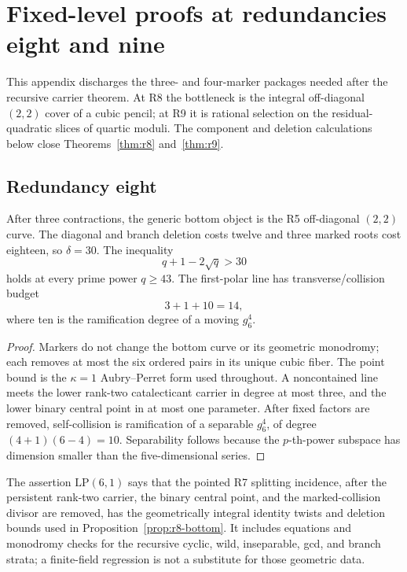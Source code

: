 \section{Fixed-level proofs at redundancies eight and nine}\label{sec:fixed}

This appendix discharges the three- and four-marker packages needed after the
recursive carrier theorem.  At R8 the bottleneck is the integral
off-diagonal \((2,2)\) cover of a cubic pencil; at R9 it is rational selection
on the residual-quadratic slices of quartic moduli.  The component and deletion
calculations below close Theorems~\ref{thm:r8} and~\ref{thm:r9}.

\subsection{Redundancy eight}

\begin{proposition}\label{prop:r8-bottom}%
%
After three contractions, the generic bottom object is the R5
off-diagonal $(2,2)$ curve.  The diagonal and branch deletion costs
twelve and three marked roots cost eighteen, so
$\delta=30$.  The inequality
\[
       q+1-2\sqrt q>30
\]
holds at every prime power $q\geq43$.  The first-polar line has
transverse/collision budget
\[
       3+1+10=14,
\]
where ten is the ramification degree of a moving $g^4_6$.
\end{proposition}

\begin{proof}
Markers do not change the bottom curve or its geometric monodromy;
each removes at most the six ordered pairs in its unique cubic fiber.
The point bound is the \(\kappa=1\) Aubry--Perret form used throughout.
A noncontained line meets the lower
rank-two catalecticant carrier in degree at most three, and the lower
binary central point in at most one parameter.  After fixed factors are
removed, self-collision is ramification of a separable $g^4_6$, of
degree $(4+1)(6-4)=10$.  Separability follows because the
$p$-th-power subspace has dimension smaller than the five-dimensional
series.
\end{proof}

\begin{definition}
\label{def:r8-lower-package}
The assertion $\mathrm{LP}(6,1)$ says that the pointed R7 splitting
incidence, after the persistent rank-two carrier, the binary central
point, and the marked-collision divisor are removed, has the
geometrically integral identity twists and deletion bounds used in
Proposition~\ref{prop:r8-bottom}.  It includes equations and
monodromy checks for the recursive cyclic, wild, inseparable, gcd, and
branch strata; a finite-field regression is not a substitute for those
geometric data.
\end{definition}

